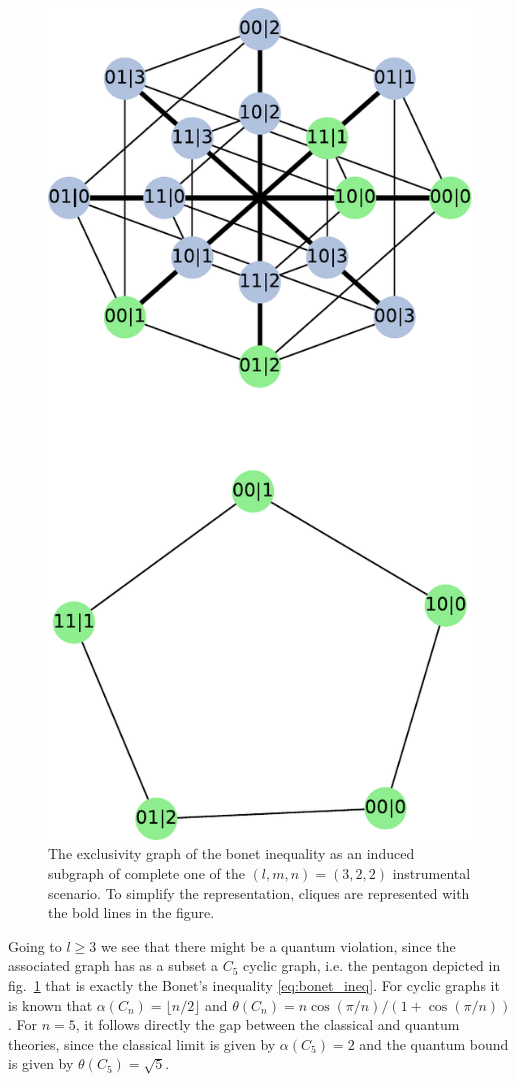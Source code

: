 \documentclass[letterpaper]{article}
\begin{document}
\begin{figure}[t]
    \centering
    \includegraphics[width=.6\columnwidth]{images/instrumental_c5.pdf}
    \caption{The exclusivity graph of the bonet inequality as an induced subgraph of complete one of the $(l,m,n)=(3,2,2)$ instrumental scenario. To simplify the representation, cliques are represented with the bold
    lines in the figure.}
    \label{fig:bonetexc}
\end{figure}

Going to $l\ge3$ we see that there might be a quantum violation, since the
associated graph has as a subset a $C_5$ cyclic graph, i.e. the pentagon
depicted in
fig.~\ref{fig:bonetexc} that is exactly the Bonet's inequality \eqref{eq:bonet_ineq}.
For cyclic graphs it is known that $\alpha(C_n) = \lfloor n/2 \rfloor$ and
$\theta(C_n) = n\cos(\pi/n)/(1+\cos(\pi/n))$. For $n=5$, it follows directly the
gap between the classical and quantum theories, since the classical limit is
given by $\alpha(C_5)=2$ and the quantum bound is given by $\theta(C_5)=\sqrt{5}$.
\end{document}
